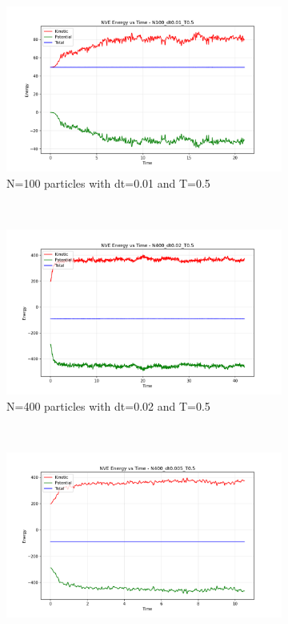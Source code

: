 \begin{figure}[H]
	\centering
	\begin{subfigure}{0.5\textwidth}
		\includegraphics[width=\textwidth]{media/energy_N100_dt0.01_T0.5.png}
		\caption{N=100 particles with dt=0.01 and T=0.5}
		\label{sfig:energy_N100}
	\end{subfigure}%
	~
	\begin{subfigure}{0.5\textwidth}
		\includegraphics[width=\textwidth]{media/energy_N400_dt0.02_T0.5.png}
		\caption{N=400 particles with dt=0.02 and T=0.5}
		\label{sfig:energy_N400_dt002}
	\end{subfigure}%
	\\
	\begin{subfigure}{0.5\textwidth}
		\includegraphics[width=\textwidth]{media/energy_N400_dt0.005_T0.5.png}

\end{subfigure}
\end{figure}
